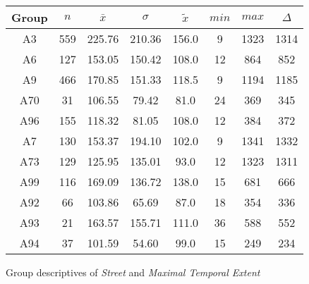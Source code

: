 \begin{figure}[ht!]
	\centering
	\begin{minipage}{0.5\textwidth}
		\tiny
		\setlength{\tabcolsep}{4pt}
		\centering
		\begin{tabular}{c|c|c|c|c|c|c|c}
			\toprule
			Group & $n$ & $\bar{x}$ & $\sigma$ & $\tilde{x}$ & $min$ & $max$ & $\Delta$ \\
			\midrule
			A3  & 559 & 225.76 & 210.36 & 156.0 & 9  & 1323 & 1314 \\ 
			A6  & 127 & 153.05 & 150.42 & 108.0 & 12 & 864  & 852  \\ 
			A9  & 466 & 170.85 & 151.33 & 118.5 & 9  & 1194 & 1185 \\ 
			A70 & 31  & 106.55 & 79.42  & 81.0 & 24 & 369  & 345  \\ 
			A96 & 155 & 118.32 & 81.05  & 108.0 & 12 & 384  & 372  \\ 
			A7  & 130 & 153.37 & 194.10 & 102.0 & 9  & 1341 & 1332 \\ 
			A73 & 129 & 125.95 & 135.01 & 93.0 & 12 & 1323 & 1311 \\ 
			A99 & 116 & 169.09 & 136.72 & 138.0 & 15 & 681  & 666  \\ 
			A92 & 66  & 103.86 & 65.69  & 87.0 & 18 & 354  & 336  \\ 
			A93 & 21  & 163.57 & 155.71 & 111.0 & 36 & 588  & 552  \\ 
			A94 & 37  & 101.59 & 54.60  & 99.0 & 15 & 249  & 234  \\ 
			\bottomrule
		\end{tabular}
		\label{tbl:descriptives_baysis_matched_Str_TMax}
	\end{minipage}%
	\begin{minipage}{0.55\textwidth}
		\tiny
		\centering
		\vfill
		\label{fig:descriptives_baysis_matched_Str_TMax}
	\end{minipage}%
	\caption{Group descriptives of \textit{Street} and \textit{Maximal Temporal Extent}}
\end{figure}
